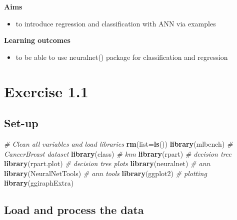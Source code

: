 \documentclass[
]{book}
\newenvironment{Shaded}{\begin{snugshade}}{\end{snugshade}}
\newcommand{\CommentTok}[1]{\textcolor[rgb]{0.56,0.35,0.01}{\textit{#1}}}
\newcommand{\DataTypeTok}[1]{\textcolor[rgb]{0.13,0.29,0.53}{#1}}
\newcommand{\KeywordTok}[1]{\textcolor[rgb]{0.13,0.29,0.53}{\textbf{#1}}}
\newcommand{\NormalTok}[1]{#1}
\providecommand{\tightlist}{%
  \setlength{\itemsep}{0pt}\setlength{\parskip}{0pt}}
\theoremstyle{definition}
\theoremstyle{definition}
\theoremstyle{definition}
\theoremstyle{remark}
\begin{document}
\textbf{Aims}

\begin{itemize}
\tightlist
\item
  to introduce regression and classification with ANN via examples
\end{itemize}

\textbf{Learning outcomes}

\begin{itemize}
\tightlist
\item
  to be able to use neuralnet() package for classification and regression
\end{itemize}

\hypertarget{exercise-1.1}{%
\section{Exercise 1.1}\label{exercise-1.1}}

\hypertarget{set-up}{%
\subsection{Set-up}\label{set-up}}

\begin{Shaded}
\begin{Highlighting}[]
\CommentTok{\# Clean all variables and load libraries}
\KeywordTok{rm}\NormalTok{(}\DataTypeTok{list=}\KeywordTok{ls}\NormalTok{())}
\KeywordTok{library}\NormalTok{(mlbench) }\CommentTok{\# CancerBreast dataset}
\KeywordTok{library}\NormalTok{(class) }\CommentTok{\# knn}
\KeywordTok{library}\NormalTok{(rpart) }\CommentTok{\# decision tree}
\KeywordTok{library}\NormalTok{(rpart.plot) }\CommentTok{\# decision tree plots}
\KeywordTok{library}\NormalTok{(neuralnet) }\CommentTok{\# ann}
\KeywordTok{library}\NormalTok{(NeuralNetTools) }\CommentTok{\# ann tools}
\KeywordTok{library}\NormalTok{(ggplot2) }\CommentTok{\# plotting}
\KeywordTok{library}\NormalTok{(ggiraphExtra)}
\end{Highlighting}
\end{Shaded}

\hypertarget{load-and-process-the-data}{%
\subsection{Load and process the data}\label{load-and-process-the-data}}
\end{document}
